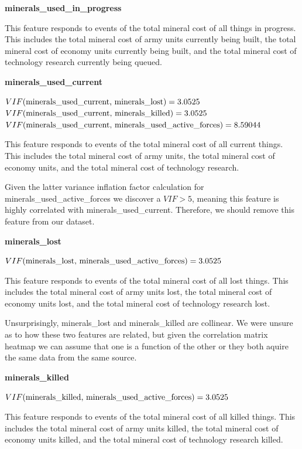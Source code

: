\documentclass[a4paper,12pt]{report}
\newcommand{\msection}[1]{\noindent\textbf{#1}}
\begin{document}
\msection{minerals\_used\_in\_progress}

This feature responds to events of the total mineral cost of all things in progress. This includes the total mineral cost of army units currently being built, the total mineral cost of economy units currently being built, and the total mineral cost of technology research currently being queued.

\msection{minerals\_used\_current}

$VIF(\text{minerals\_used\_current, minerals\_lost}) = \pgfmathparse{1/(1-(-.82)^2)}\pgfmathresult$ \\
$VIF(\text{minerals\_used\_current, minerals\_killed}) = \pgfmathparse{1/(1-(-.82)^2)}\pgfmathresult$ \\
$VIF(\text{minerals\_used\_current, minerals\_used\_active\_forces}) = \pgfmathparse{1/(1-(.94)^2)}\pgfmathresult$

This feature responds to events of the total mineral cost of all current things. This includes the total mineral cost of army units, the total mineral cost of economy units, and the total mineral cost of technology research.

Given the latter variance inflation factor calculation for minerals\_used\_active\_forces we discover a $VIF > 5$, meaning this feature is highly correlated with minerals\_used\_current. Therefore, we should remove this feature from our dataset.

\msection{minerals\_lost}

$VIF(\text{minerals\_lost, minerals\_used\_active\_forces}) = \pgfmathparse{1/(1-(-.82)^2)}\pgfmathresult$

This feature responds to events of the total mineral cost of all lost things. This includes the total mineral cost of army units lost, the total mineral cost of economy units lost, and the total mineral cost of technology research lost.

Unsurprisingly, minerals\_lost and minerals\_killed are collinear. We were unsure as to how these two features are related, but given the correlation matrix heatmap we can assume that one is a function of the other or they both aquire the same data from the same source.

\msection{minerals\_killed}

$VIF(\text{minerals\_killed, minerals\_used\_active\_forces}) = \pgfmathparse{1/(1-(-.82)^2)}\pgfmathresult$

This feature responds to events of the total mineral cost of all killed things. This includes the total mineral cost of army units killed, the total mineral cost of economy units killed, and the total mineral cost of technology research killed.
\end{document}
